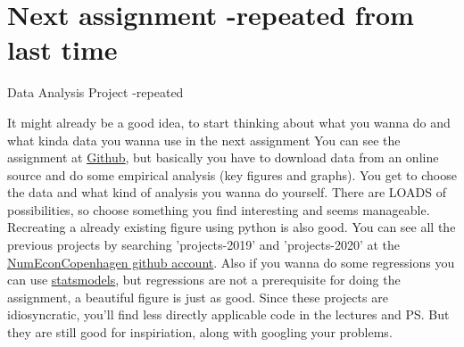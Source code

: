 \documentclass[10pt,danish,t,10pt]{beamer}
\begin{document}
\section{Next assignment -repeated from last time}
\begin{frame}{Data Analysis Project -repeated}

    It might already be a good idea, to start thinking about what you wanna do and what kinda data you wanna use in the next assignment \newline
    You can see the assignment at \href{https://github.com/NumEconCopenhagen/lectures-2021/blob/master/projects/DataProject.pdf}{\underline{Github}}, but basically you have to download data from an online source and do some empirical analysis (key figures and graphs).
    You get to choose the data and what kind of analysis you wanna do yourself. There are LOADS of possibilities, so choose something you find interesting and seems manageable. Recreating a already existing figure using python is also good. \newline
    You can see all the previous projects by searching 'projects-2019' and 'projects-2020' at the \href{https://github.com/NumEconCopenhagen}{\underline{NumEconCopenhagen github account}}. \newline
    Also if you wanna do some regressions you can use \href{https://www.statsmodels.org/stable/user-guide.html}{\underline{statsmodels}}, but regressions are not a prerequisite for doing the assignment, a beautiful figure is just as good. \newline
    Since these projects are idiosyncratic, you'll find less directly applicable code in the lectures and PS. But they are still good for inspiriation, along with googling your problems.
\end{frame}
\end{document}
